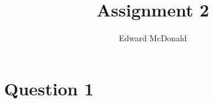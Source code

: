 \documentclass{unswmaths}
\begin{document}
\subject{Functional Analysis}
\author{Edward McDonald}
\title{Assignment 2}


\setlength\parindent{0pt}

\unswtitle{}

\section*{Question 1}
\end{document}
